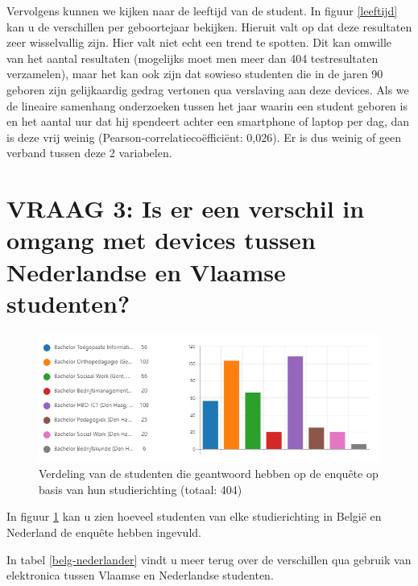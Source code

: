Vervolgens kunnen we kijken naar de leeftijd van de student. In figuur \ref{leeftijd} kan u de verschillen per geboortejaar bekijken. Hieruit valt op dat deze resultaten zeer wisselvallig zijn. Hier valt niet echt een trend te spotten. Dit kan omwille van het aantal resultaten (mogelijks moet men meer dan 404 testresultaten verzamelen), maar het kan ook zijn dat sowieso studenten die in de jaren 90 geboren zijn gelijkaardig gedrag vertonen qua verslaving aan deze devices. Als we de lineaire samenhang onderzoeken tussen het jaar waarin een student geboren is en het aantal uur dat hij spendeert achter een smartphone of laptop per dag, dan is deze vrij weinig (Pearson-correlatiecoëfficiënt: 0,026). Er is dus weinig of geen verband tussen deze 2 variabelen.

\section{VRAAG 3: Is er een verschil in omgang met devices tussen Nederlandse en Vlaamse studenten?}
\label{sec:vlaanderen-nederland}

\begin{figure}
	\includegraphics[width=\textwidth]
	{img/verdeling-enquete-richting.png}
	\caption{Verdeling van de studenten die geantwoord hebben op de enquête op basis van hun studierichting (totaal: 404)}
	\label{fig:verdeling-enquete-richting}
\end{figure}

In figuur \ref{fig:verdeling-enquete-richting} kan u zien hoeveel studenten van elke studierichting in België en Nederland de enquête hebben ingevuld. 

In tabel \ref{belg-nederlander} vindt u meer terug over de verschillen qua gebruik van elektronica tussen Vlaamse en Nederlandse studenten.

